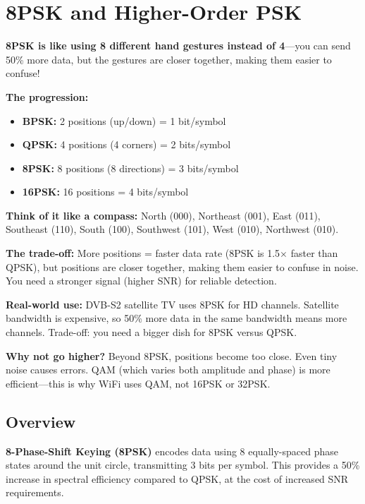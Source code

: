 \chapter{8PSK and Higher-Order PSK}
\label{ch:8psk}

\begin{nontechnical}
\textbf{8PSK is like using 8 different hand gestures instead of 4}---you can send 50\% more data, but the gestures are closer together, making them easier to confuse!

\textbf{The progression:}
\begin{itemize}
\item \textbf{BPSK:} 2 positions (up/down) = 1 bit/symbol
\item \textbf{QPSK:} 4 positions (4 corners) = 2 bits/symbol
\item \textbf{8PSK:} 8 positions (8 directions) = 3 bits/symbol
\item \textbf{16PSK:} 16 positions = 4 bits/symbol
\end{itemize}

\textbf{Think of it like a compass:} North (000), Northeast (001), East (011), Southeast (110), South (100), Southwest (101), West (010), Northwest (010).

\textbf{The trade-off:} More positions = faster data rate (8PSK is 1.5$\times$ faster than QPSK), but positions are closer together, making them easier to confuse in noise. You need a stronger signal (higher SNR) for reliable detection.

\textbf{Real-world use:} DVB-S2 satellite TV uses 8PSK for HD channels. Satellite bandwidth is expensive, so 50\% more data in the same bandwidth means more channels. Trade-off: you need a bigger dish for 8PSK versus QPSK.

\textbf{Why not go higher?} Beyond 8PSK, positions become too close. Even tiny noise causes errors. QAM (which varies both amplitude and phase) is more efficient---this is why WiFi uses QAM, not 16PSK or 32PSK.
\end{nontechnical}

\section{Overview}

\textbf{8-Phase-Shift Keying (8PSK)} encodes data using 8 equally-spaced phase states around the unit circle, transmitting 3 bits per symbol. This provides a 50\% increase in spectral efficiency compared to QPSK, at the cost of increased SNR requirements.

